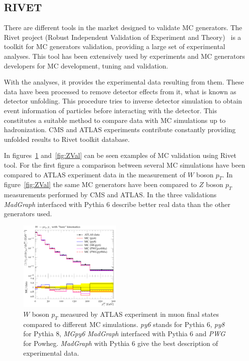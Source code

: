 \subsection{RIVET}
\label{sec:rivet}

There are different tools in the market designed to validate MC generators. The Rivet project (Robust Independent Validation of Experiment and Theory)~\cite{Buckley:2010ar} is a toolkit for MC generators validation, providing a large set of experimental analyses. This tool has been extensively used by experiments and MC generators developers for MC development, tuning and validation. 

With the analyses, it provides the experimental data resulting from them. These data have been processed to remove detector effects from it, what is known as detector unfolding. This procedure tries to inverse detector simulation to obtain event information of particles before interacting with the detector. This constitutes a suitable method to compare data with MC simulations up to hadronization. CMS and ATLAS experiments contribute constantly providing unfolded results to Rivet toolkit database.

In figures~\ref{fig:WVal} and~\ref{fig:ZVal} can be seen examples of MC validation using Rivet tool. For the first figure a comparison between several MC simulations have been compared to ATLAS experiment data in the measurement of $W$ boson $p_{T}$. In figure~\ref{fig:ZVal} the same MC generators have been compared to $Z$ boson $p_{T}$ measurements performed by CMS and ATLAS. In the three validations \textit{MadGraph} interfaced with Pythia 6 describe better real data than the other generators used. 

\begin{figure}[!Hhtbp]
  \begin{center}
    \includegraphics[width=0.45\textwidth]{figs/Wpt_rivet.png}
    \caption{$W$ boson $p_{T}$ measured by ATLAS experiment in muon final states compared to different MC simulations. \textit{py6} stands for Pythia 6, \textit{py8} for Pythia 8, \textit{MGpy6} \textit{MadGraph} interfaced with Pythia 6 and \textit{PWG} for Powheg. \textit{MadGraph} with Pythia 6 give the best description of experimental data.}
    \label{fig:WVal}
  \end{center}
\end{figure}

